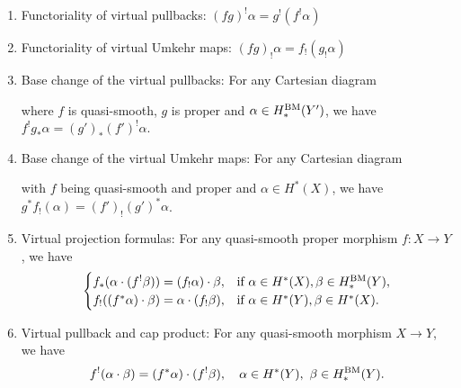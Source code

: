 \documentclass[10pt]{amsart}
\newcommand{\BM}{\textnormal{BM}}
\newcommand{\+}{{}^+}
\theoremstyle{definition}
\theoremstyle {definition}
\theoremstyle {definition}
\begin{document}
\begin{enumerate}
    \item [(A9)] Functoriality of virtual pullbacks: $(fg)^!\alpha=g^!(f^!\alpha)$ 
    \item [(A10)] Functoriality of virtual Umkehr maps: $(fg)_!\alpha=f_!(g_!\alpha)$ 
    \item [(A11)] Base change of the virtual pullbacks: For any Cartesian diagram
    \begin{center}
    \end{center}
    where $f$ is quasi-smooth, $g$ is proper and $\alpha\in H^{\BM}_*(Y')$, we have $f^!g_*\alpha=(g')_*(f')^!\alpha$.
    \item [(A12)] Base change of the virtual Umkehr maps: For any Cartesian diagram
    \begin{center}
    \end{center}
    with $f$ being quasi-smooth and proper and $\alpha\in H^*(X)$, we have $g^*f_!(\alpha)=(f')_!(g')^*\alpha$.
    \item [(A13)] Virtual projection formulas: For any quasi-smooth proper morphism $f:X\rightarrow Y$, we have 
    $$\begin{cases}
        f_*(\alpha\cdot (f^!\beta)) = (f_!\alpha)\cdot \beta,& \textnormal{if } \alpha\in H^*(X), \beta\in H^{\BM}_*(Y), \\
            f_!((f^*\alpha)\cdot\beta)=\alpha\cdot(f_!\beta),& \textnormal{if } \alpha\in H^*(Y), \beta\in H^*(X).
    \end{cases}$$
    \item [(A14)] Virtual pullback and cap product: For any quasi-smooth morphism $X\rightarrow Y$, we have
    $$f^!(\alpha\cdot \beta)=(f^*\alpha)\cdot (f^!\beta),\quad \alpha\in H^*(Y),\ \beta\in H^\BM_*(Y). 
    $$
\end{enumerate}







 

\end{document}

